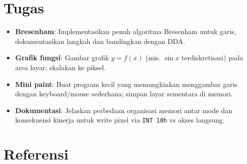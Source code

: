 \section{Tugas}
\begin{itemize}
  \item \textbf{Bresenham}: Implementasikan penuh algoritma Bresenham untuk garis, dokumentasikan langkah dan bandingkan dengan DDA.
  \item \textbf{Grafik fungsi}: Gambar grafik \(y=f(x)\) (mis. \(\sin x\) terdiskretisasi) pada area layar; skalakan ke piksel.
  \item \textbf{Mini paint}: Buat program kecil yang memungkinkan menggambar garis dengan keyboard/mouse sederhana; simpan layar sementara di memori.
  \item \textbf{Dokumentasi}: Jelaskan perbedaan organisasi memori antar mode dan konsekuensi kinerja untuk write pixel via \texttt{INT 10h} vs akses langsung.
\end{itemize}

\section{Referensi}
